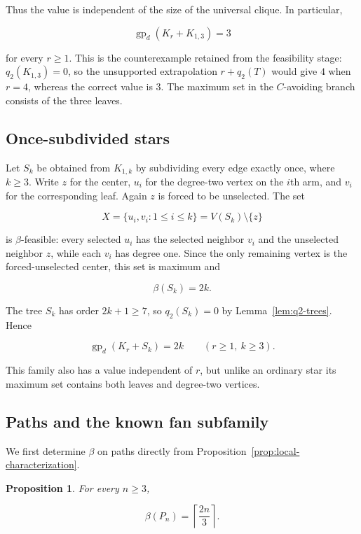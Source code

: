 \documentclass[11pt,a4paper]{article}
\newtheorem{proposition}[theorem]{Proposition}
\numberwithin{equation}{section}
\begin{document}
Thus the value is independent of the size of the universal clique. In
particular,

\[
\operatorname{gp}_d(K_r+K_{1,3})=3
\]

for every \(r\ge 1\). This is the counterexample retained from the
feasibility stage: \(q_2(K_{1,3})=0\), so the unsupported extrapolation
\(r+q_2(T)\) would give \(4\) when \(r=4\), whereas the correct value is
\(3\). The maximum set in the \(C\)-avoiding branch consists of the three
leaves.

\subsection{Once-subdivided stars}\label{sec:subdivided-stars}

Let \(S_k\) be obtained from \(K_{1,k}\) by subdividing every edge
exactly once, where \(k\ge 3\). Write \(z\) for the center, \(u_i\) for
the degree-two vertex on the \(i\)th arm, and \(v_i\) for the
corresponding leaf. Again \(z\) is forced to be unselected. The set

\[
X=\{u_i,v_i:1\le i\le k\}=V(S_k)\setminus\{z\}
\]

is \(\beta\)-feasible: every selected \(u_i\) has the selected neighbor
\(v_i\) and the unselected neighbor \(z\), while each \(v_i\) has degree
one. Since the only remaining vertex is the forced-unselected center,
this set is maximum and

\[
\beta(S_k)=2k.
\]

The tree \(S_k\) has order \(2k+1\ge 7\), so \(q_2(S_k)=0\) by
Lemma~\ref{lem:q2-trees}. Hence

\begin{equation}\label{eq:subdivided-star-family}
\operatorname{gp}_d(K_r+S_k)=2k
\qquad (r\ge 1,\ k\ge 3).
\end{equation}

This family also has a value independent of \(r\), but unlike an
ordinary star its maximum set contains both leaves and degree-two
vertices.

\subsection{Paths and the known fan subfamily}\label{sec:paths}

We first determine \(\beta\) on paths directly from Proposition~\ref{prop:local-characterization}.

\begin{proposition}\label{prop:beta-path}
For every \(n\ge 3\),

\[
\beta(P_n)=\left\lceil\frac{2n}{3}\right\rceil.
\]
\end{proposition}
\end{document}

